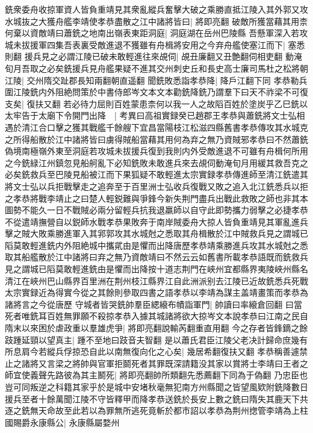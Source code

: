 銑衆委舟收掠軍資人皆負重靖見其衆亂縱兵奮擊大破之乘勝直抵江陵入其外郭又攻水城抜之大獲舟艦李靖使孝恭盡散之江中諸將皆曰|{
	將即亮翻}
破敵所獲當藉其用柰何棄以資敵靖曰蕭銑之地南出嶺表東距洞庭|{
	洞庭湖在岳州巴陵縣}
吾懸軍深入若攻城未拔援軍四集吾表裏受敵進退不獲雖有舟楫將安用之今弃舟艦使塞江而下|{
	塞悉則翻}
援兵見之必謂江陵已破未敢輕進往來覘伺|{
	覘丑廉翻又丑艶翻伺相吏翻}
動淹旬月吾取之必矣銑援兵見舟艦果疑不進其交州刺史丘和長史高士廉司馬杜之松將朝江陵|{
	交州隋交趾郡長知兩翻朝直遥翻}
聞銑敗悉詣孝恭降|{
	降戶江翻下同}
孝恭勒兵圍江陵銑内外阻絶問策於中書侍郎岑文本文本勸銑降銑乃謂羣下曰天不祚梁不可復支矣|{
	復扶又翻}
若必待力屈則百姓蒙患柰何以我一人之故䧟百姓於塗炭乎乙巳銑以太牢告于太廟下令開門出降　|{
	考異曰高祖實録癸已趙郡王孝恭與蕭銑將文士弘相遇於清江合口擊之獲其戰艦千餘艘下宜昌當陽枝江松滋四縣舊書孝恭傳攻其水城克之所得船散於江中諸將皆曰虜得賊船當藉其用何為弃之無乃資賊邪孝恭曰不然蕭銑偽境南極嶺外東至洞庭若攻城未拔援兵復到我則内外受敵進退不可雖有舟楫何所用之今銑緑江州鎮忽見船舸亂下必知銑敗未敢進兵來去覘伺動淹旬月用緩其救吾克之必矣銑救兵至巴陵見船被江而下果狐疑不敢輕進太宗實録孝恭傳進師至清江銑遣其將文士弘以兵拒戰擊走之追奔至于百里洲士弘收兵復戰又敗之追入北江銑悉兵以拒之孝恭將戰李靖止之曰楚人輕鋭難與爭鋒今新失荆門盡兵出戰此救敗之師也非其本圖勢不能久一日不戰賊必兩分留輕兵抗我退羸師以自守此即勢攜力弱擊之必捷孝恭不從遣靖撫營自以鋭師水戰孝恭果敗奔于南岸賊委舟大掠人皆負重靖見其軍亂進兵擊之賊大敗乘勝進軍入其郛郭攻其水城尅之悉取其舟楫散於江中賊救兵見之謂城已䧟莫敢輕進銑内外阻絶城中攜貮由是懼而出降唐歷孝恭靖乘勝進兵攻其水城尅之悉取其船艦散於江中諸將曰弃之無乃資敵靖曰不然云云如舊書所載孝恭語既而銑救兵見之謂城已䧟莫敢輕進銑由是懼而出降按十道志荆門在峽州宜都縣界夷陵峽州縣名清江在峽州巴山縣界百里洲在荆州枝江縣界江自此洲派别去江陵已近故銑悉兵死戰太宗實録近為得實今從之其餘則參取四書之語孝恭以李靖為謀主盖靖畫策而孝恭為諸將言之今從唐歷}
守城者皆哭銑帥羣臣緦縗布幘詣軍門|{
	帥讀曰率縗倉回翻}
曰當死者唯銑耳百姓無罪願不殺掠孝恭入據其城諸將欲大掠岑文本說孝恭曰江南之民自隋末以來困於虐政重以羣雄虎爭|{
	將即亮翻說輸芮翻重直用翻}
今之存者皆鋒鏑之餘跂踵延頸以望真主|{
	踵不至地曰跂音夫智翻}
是以蕭氏君臣江陵父老决計歸命庶幾有所息肩今若縱兵俘掠恐自此以南無復向化之心矣|{
	幾居希翻復扶又翻}
孝恭稱善遽禁止之諸將又言梁之將帥與官軍拒鬬死者其罪既深請籍没其家以賞將士李靖曰王者之師宜使義聲先路彼為其主鬭死|{
	將即亮翻帥所類翻先悉薦翻下同為于偽翻}
乃忠臣也豈可同叛逆之科籍其家乎於是城中安堵秋毫無犯南方州縣聞之皆望風欵附銑降數日援兵至者十餘萬聞江陵不守皆釋甲而降孝恭送銑於長安上數之銑曰隋失其鹿天下共逐之銑無天命故至此若以為罪無所逃死竟斬於都市詔以孝恭為荆州揔管李靖為上柱國賜爵永康縣公|{
	永康縣屬婺州}
